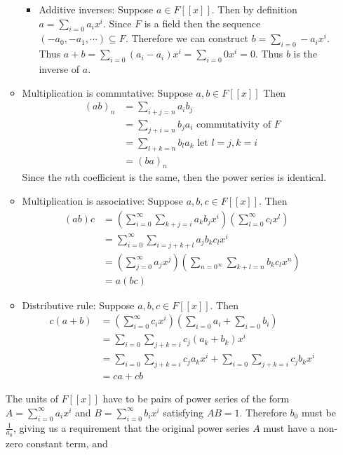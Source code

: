 \documentclass[12pt, letterpaper]{article}
\begin{document}
\begin{enumerate}
\begin{itemize}
\begin{itemize}
			
			\item Additive inverses: Suppose $a \in F[[x]]$.  
			Then by definition $a = \sum_{i=0}a_ix^i$.  Since $F$ is a field
			then the sequence $(-a_0,-a_1,\cdots) \subseteq F$.  Therefore 
			we can construct $b = \sum_{i=0}-a_ix^i$.  
			Thus $a+b = \sum_{i=0} (a_i - a_i)x^i = \sum_{i=0} 0x^i = 0$.
			Thus $b$ is the inverse of $a$.  
		\end{itemize}
		\item Multiplication is commutative: Suppose $a,b \in F[[x]]$ Then 
		\begin{align*}
		(ab)_n  &= \sum_{i+j = n}a_ib_j\\
		&= \sum_{j+i = n}b_ja_i  \text{ commutativity of } F\\
		&= \sum_{l+k = n}b_la_k  \text{ let } l = j, k = i\\
		&= (ba)_n
		\end{align*}
		Since the $n$th coefficient is the same, then the power series is identical.  
		\item Multiplication is associative: Suppose $a,b,c \in F[[x]]$. 
		Then 
		\begin{align*}
			(ab)c &= \left( \sum_{i=0}^\infty \sum_{k+j = i} a_k b_j x^i \right)\left( \sum_{l=0}^\infty c_l x^l \right)\\
			&= \sum_{i=0}^\infty \sum_{i = j+k+l} a_j b_k c_l x^i\\
			&= \left( \sum_{j=0}^\infty a_j x^j \right) \left(\sum_{n=0^\infty} \sum_{k+l = n}b_k c_l x^n \right)\\
			&= a(bc)
		\end{align*}
		\item Distributive rule: Suppose $a,b,c \in F[[x]]$.  Then
		\begin{align*}
			c(a+b) &= \left( \sum_{i=0}^\infty c_i x^i \right) \left( \sum_{i=0} a_i + \sum_{i=0} b_i \right)\\
			&= \sum_{i=0} \sum_{j+k = i} c_j (a_k + b_k)x^i \\
			&= \sum_{i=0} \sum_{j+k = i}c_j a_k x^i + \sum_{i=0} \sum_{j+k = i}c_j b_k x^i\\
			&= ca + cb
		\end{align*}
	\end{itemize}
	The units of $F[[x]]$ have to be pairs of power series of the form 
	$A = \sum_{i=0}^\infty a_i x^i$ and $B = \sum_{i=0}^\infty b_i x^i$ satisfying
	$AB = 1$.  Therefore $b_0$ must be $\frac{1}{a_0}$, giving us a requirement 
	that the original power series $A$ must have a non-zero constant term, and 

\end{enumerate}
\end{document}
